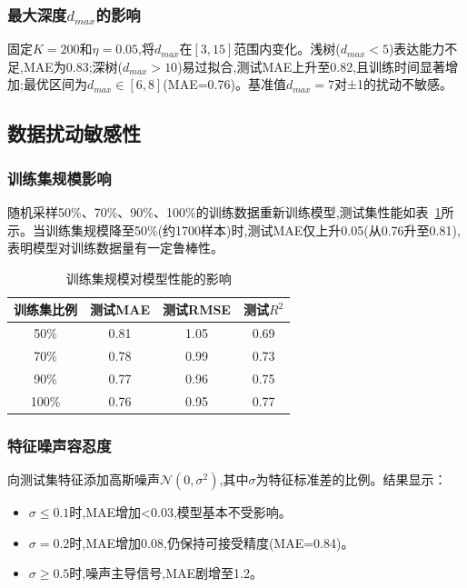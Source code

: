 \subsubsection{最大深度$d_{max}$的影响}

固定$K=200$和$\eta=0.05$,将$d_{max}$在$[3, 15]$范围内变化。浅树($d_{max}<5$)表达能力不足,MAE为0.83;深树($d_{max}>10$)易过拟合,测试MAE上升至0.82,且训练时间显著增加;最优区间为$d_{max} \in [6, 8]$(MAE=0.76)。基准值$d_{max}=7$对±1的扰动不敏感。

\subsection{数据扰动敏感性}

\subsubsection{训练集规模影响}

随机采样50\%、70\%、90\%、100\%的训练数据重新训练模型,测试集性能如表~\ref{tab:sensitivity_data}所示。当训练集规模降至50\%(约1700样本)时,测试MAE仅上升0.05(从0.76升至0.81),表明模型对训练数据量有一定鲁棒性。

\begin{table}[htbp]
\centering
\caption{训练集规模对模型性能的影响}
\label{tab:sensitivity_data}
\begin{tabular}{c|ccc}
\toprule
\textbf{训练集比例} & \textbf{测试MAE} & \textbf{测试RMSE} & \textbf{测试$R^2$} \\
\midrule
50\% & 0.81 & 1.05 & 0.69 \\
70\% & 0.78 & 0.99 & 0.73 \\
90\% & 0.77 & 0.96 & 0.75 \\
100\% & 0.76 & 0.95 & 0.77 \\
\bottomrule
\end{tabular}
\end{table}

\subsubsection{特征噪声容忍度}

向测试集特征添加高斯噪声$\mathcal{N}(0, \sigma^2)$,其中$\sigma$为特征标准差的比例。结果显示：

\begin{itemize}
\item $\sigma \leq 0.1$时,MAE增加<0.03,模型基本不受影响。
\item $\sigma=0.2$时,MAE增加0.08,仍保持可接受精度(MAE=0.84)。
\item $\sigma \geq 0.5$时,噪声主导信号,MAE剧增至1.2。
\end{itemize}

